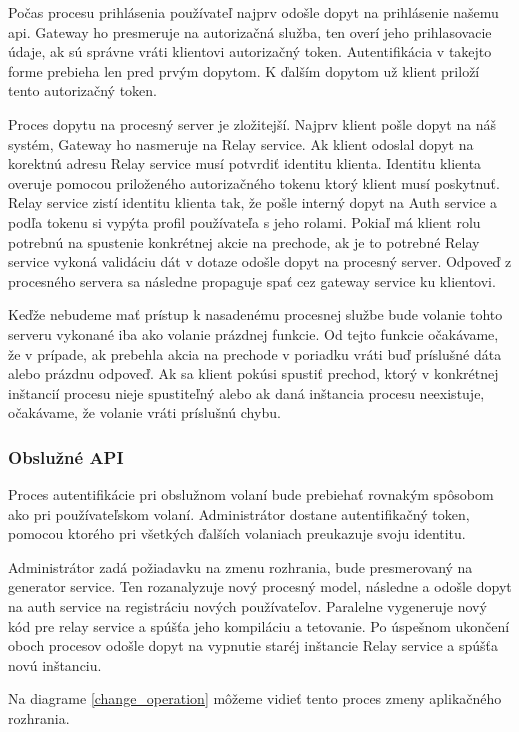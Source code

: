 Počas procesu prihlásenia používateľ najprv odošle dopyt na prihlásenie našemu \acrshort{api}.  Gateway ho presmeruje na autorizačná služba, ten overí jeho prihlasovacie údaje, ak sú správne vráti klientovi autorizačný token. Autentifikácia v takejto forme prebieha len pred prvým dopytom. K ďalším dopytom už klient priloží tento autorizačný token. 

Proces dopytu na procesný server je zložitejší. Najprv klient pošle dopyt na náš systém, Gateway ho nasmeruje na Relay service. Ak klient odoslal dopyt na korektnú adresu Relay service musí potvrdiť identitu klienta. Identitu klienta overuje pomocou priloženého autorizačného tokenu ktorý klient musí poskytnuť. Relay service zistí identitu klienta tak, že pošle interný dopyt na  Auth service a podľa tokenu si vypýta profil používateľa s jeho rolami.  Pokiaľ má klient rolu potrebnú na spustenie konkrétnej akcie na prechode, ak je to potrebné Relay service vykoná validáciu dát  v dotaze odošle dopyt na procesný server.  Odpoveď z procesného servera sa následne propaguje spať cez gateway service ku klientovi.
 
Keďže nebudeme mať prístup k nasadenému procesnej službe bude volanie tohto serveru vykonané iba ako volanie prázdnej funkcie. Od tejto funkcie očakávame, že v prípade, ak prebehla akcia na prechode v poriadku vráti buď príslušné dáta alebo prázdnu odpoveď.  Ak sa klient pokúsi spustiť prechod, ktorý v konkrétnej inštancií procesu nieje spustiteľný alebo ak daná inštancia procesu neexistuje, očakávame, že volanie vráti príslušnú chybu. 

\subsubsection{Obslužné API}
Proces autentifikácie pri obslužnom volaní bude prebiehať rovnakým spôsobom ako pri  používateľskom volaní. Administrátor dostane autentifikačný token, pomocou ktorého pri všetkých ďalších volaniach preukazuje svoju identitu.

Administrátor zadá požiadavku na zmenu rozhrania, bude presmerovaný na generator service. Ten rozanalyzuje nový procesný model, následne a odošle dopyt na auth service na registráciu nových používateľov. Paralelne vygeneruje nový kód pre relay service a spúšťa jeho kompiláciu a tetovanie. Po úspešnom ukončení oboch procesov odošle dopyt na vypnutie staréj inštancie Relay service a spúšťa novú inštanciu.

Na diagrame \ref{change_operation} môžeme vidieť tento proces zmeny aplikačného rozhrania.

